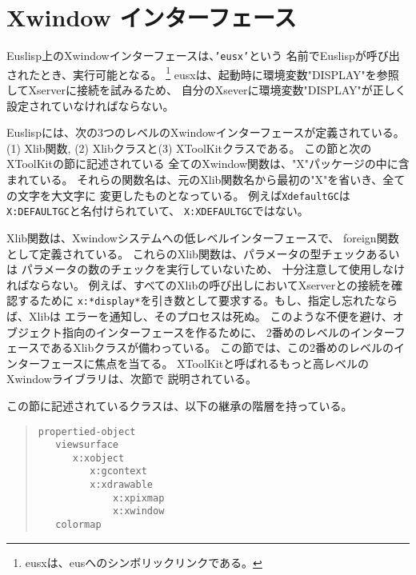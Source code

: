 \section{Xwindow インターフェース}
Euslisp上のXwindowインターフェースは、{\tt 'eusx'}という
名前でEuslispが呼び出されたとき、実行可能となる。
\footnote{eusxは、eusへのシンボリックリンクである。}
eusxは、起動時に環境変数"DISPLAY"を参照してXserverに接続を試みるため、
自分のXseverに環境変数"DISPLAY"が正しく設定されていなければならない。

Euslispには、次の3つのレベルのXwindowインターフェースが定義されている。
(1) Xlib関数, (2) Xlibクラスと(3) XToolKitクラスである。
この節と次のXToolKitの節に記述されている
全てのXwindow関数は、"X"パッケージの中に含まれている。
それらの関数名は、元のXlib関数名から最初の"X"を省いき、全ての文字を大文字に
変更したものとなっている。
例えば{\tt XdefaultGC}は{\tt X:DEFAULTGC}と名付けられていて、
{\tt X:XDEFAULTGC}ではない。

Xlib関数は、Xwindowシステムへの低レベルインターフェースで、
foreign関数として定義されている。
これらのXlib関数は、パラメータの型チェックあるいは
パラメータの数のチェックを実行していないため、
十分注意して使用しなければならない。
例えば、すべてのXlibの呼び出しにおいてXserverとの接続を確認するために
{\tt x:*display*}を引き数として要求する。もし、指定し忘れたならば、Xlibは
エラーを通知し、そのプロセスは死ぬ。
このような不便を避け、オブジェクト指向のインターフェースを作るために、
2番めのレベルのインターフェースであるXlibクラスが備わっている。
この節では、この2番めのレベルのインターフェースに焦点を当てる。
XToolKitと呼ばれるもっと高レベルのXwindowライブラリは、次節で
説明されている。

この節に記述されているクラスは、以下の継承の階層を持っている。

\begin{quote}
\begin{verbatim}
propertied-object
   viewsurface
      x:xobject
         x:gcontext
         x:xdrawable
             x:xpixmap
             x:xwindow
   colormap
\end{verbatim}
\end{quote}

